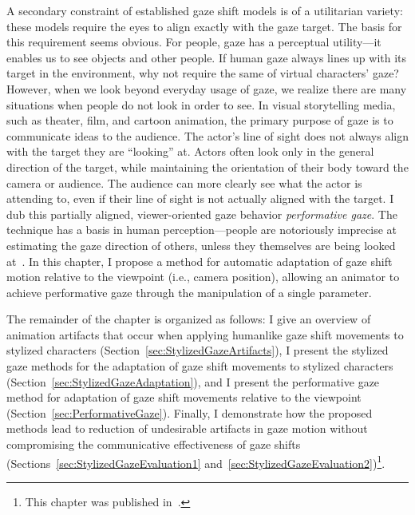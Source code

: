 A secondary constraint of established gaze shift models is of a utilitarian variety: these models require the eyes to align exactly with the gaze target. The basis for this requirement seems obvious. For people, gaze has a perceptual utility---it enables us to see objects and other people. If human gaze always lines up with its target in the environment, why not require the same of virtual characters' gaze?
However, when we look beyond everyday usage of gaze, we realize there are many situations when people do not look in order to see.
In visual storytelling media, such as theater, film, and cartoon animation, the primary purpose of gaze is to communicate ideas to the audience. The actor's line of sight does not always align with the target they are ``looking'' at. Actors often look only in the general direction of the target, while maintaining the orientation of their body toward the camera or audience. The audience can more clearly see what the actor is attending to, even if their line of sight is not actually aligned with the target.
I dub this partially aligned, viewer-oriented gaze behavior \emph{performative gaze}. The technique has a basis in human perception---people are notoriously imprecise at estimating the gaze direction of others, unless they themselves are being looked at~\citep{argyle1976gaze}. In this chapter, I propose a method for automatic adaptation of gaze shift motion relative to the viewpoint (i.e., camera position), allowing an animator to achieve performative gaze through the manipulation of a single parameter.

The remainder of the chapter is organized as follows: I give an overview of animation artifacts that occur when applying humanlike gaze shift movements to stylized characters (Section~\ref{sec:StylizedGazeArtifacts}), I present the stylized gaze methods for the adaptation of gaze shift movements to stylized characters (Section~\ref{sec:StylizedGazeAdaptation}), and I present the performative gaze method for adaptation of gaze shift movements relative to the viewpoint (Section~\ref{sec:PerformativeGaze}). Finally, I demonstrate how the proposed methods lead to reduction of undesirable artifacts in gaze motion without compromising the communicative effectiveness of gaze shifts (Sections~\ref{sec:StylizedGazeEvaluation1} and~\ref{sec:StylizedGazeEvaluation2})\footnote{This chapter was published in~\citet{pejsa2013stylized}.}. 